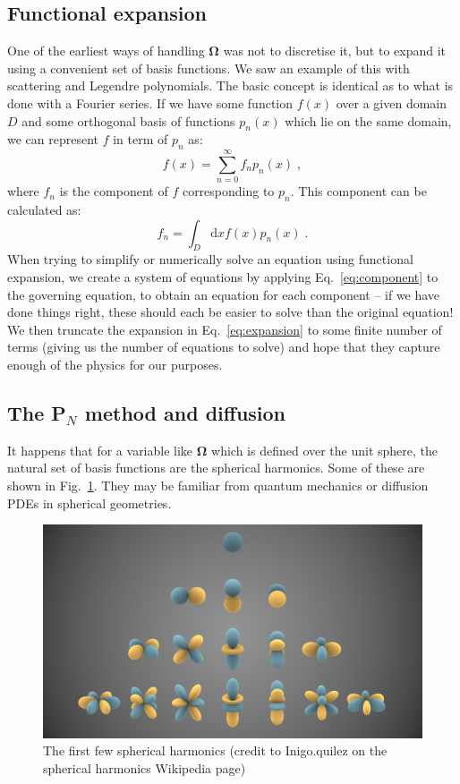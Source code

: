 \documentclass{article}
\begin{document}
\subsection{Functional expansion}
One of the earliest ways of handling $\mathbf{\Omega}$ was not to discretise it, but to expand it using a convenient set of basis functions. We saw an example of this with scattering and Legendre polynomials. The basic concept is identical as to what is done with a Fourier series. If we have some function $f(x)$ over a given domain $D$ and some orthogonal basis of functions $p_n(x)$ which lie on the same domain, we can represent $f$ in term of $p_n$ as:
\begin{equation}\label{eq:expansion}
    f(x) = \sum^\infty_{n=0} f_n p_n(x)\;\mathrm{,}
\end{equation}
where $f_n$ is the component of $f$ corresponding to $p_n$. This component can be calculated as:
\begin{equation}\label{eq:component}
    f_n = \int_D \mathrm{d}x f(x) p_n(x)\;\mathrm{.}
\end{equation}
When trying to simplify or numerically solve an equation using functional expansion, we create a system of equations by applying Eq.~\eqref{eq:component} to the governing equation, to obtain an equation for each component -- if we have done things right, these should each be easier to solve than the original equation! We then truncate the expansion in Eq.~\eqref{eq:expansion} to some finite number of terms (giving us the number of equations to solve) and hope that they capture enough of the physics for our purposes.

\subsection{The P$_N$ method and diffusion}

It happens that for a variable like $\mathbf{\Omega}$ which is defined over the unit sphere, the natural set of basis functions are the spherical harmonics. Some of these are shown in Fig.~\ref{fig:SH}. They may be familiar from quantum mechanics or diffusion PDEs in spherical geometries.

\begin{figure}[h]
    \centering
    \includegraphics[width=0.6\linewidth]{./Spherical_Harmonics.png}
    \caption{The first few spherical harmonics (credit to Inigo.quilez on the spherical harmonics Wikipedia page)}
    \label{fig:SH}
\end{figure}
\end{document}
